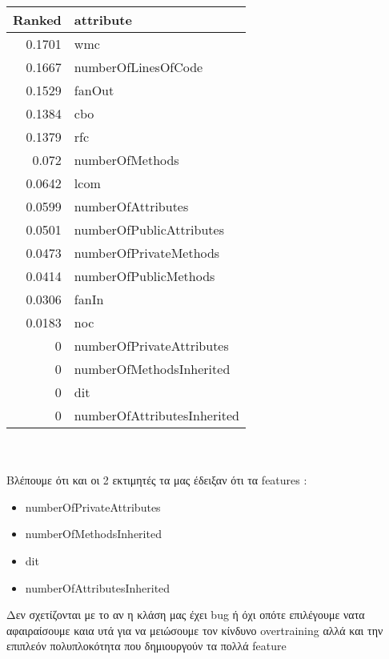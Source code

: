 \begin{tabular}{r|l}
 Ranked & attribute\\
\hline
 0.1701 &  wmc\\
 0.1667&   numberOfLinesOfCode\\
 0.1529&   fanOut\\
 0.1384&   cbo\\
 0.1379&   rfc\\
 0.072 &  numberOfMethods\\
 0.0642&   lcom\\
 0.0599&   numberOfAttributes\\
 0.0501&   numberOfPublicAttributes\\
 0.0473&  numberOfPrivateMethods\\
 0.0414&   numberOfPublicMethods\\
 0.0306&   fanIn\\
 0.0183&   noc\\
 0      &  numberOfPrivateAttributes\\
 0      &  numberOfMethodsInherited\\
 0      &  dit\\
 0      &  numberOfAttributesInherited\\
 \end{tabular}\newline \\ \\ 
Βλέπουμε ότι και οι 2 εκτιμητές τα μας έδειξαν ότι       τα features :
\begin{itemize}
\bfseries
\item numberOfPrivateAttributes
\item numberOfMethodsInherited
\item dit
\item numberOfAttributesInherited 
\end{itemize}
 Δεν σχετίζονται με το αν η κλάση μας έχει bug ή όχι οπότε επιλέγουμε νατα αφαιραίσουμε καια υτά 
 για να μειώσουμε τον κίνδυνο overtraining αλλά και την επιπλεόν πολυπλοκότητα που δημιουργούν τα πολλά feature
